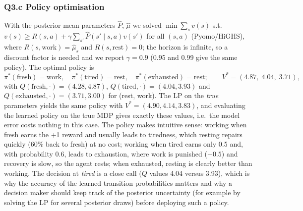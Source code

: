 \documentclass[10pt,a4paper]{article}
\begin{document}
\subsubsection{Q3.c Policy optimisation} With the posterior-mean parameters $\hat P$, $\hat\mu$ we solved $\min\sum_s v(s)$ s.t.\ $v(s)\ge R(s,a)+\gamma\sum_{s'}\hat P(s'\mid s,a)v(s')$ for all $(s,a)$ (Pyomo/HiGHS), where $R(s,\text{work})=\hat\mu_s$ and $R(s,\text{rest})=0$; the horizon is infinite, so a discount factor is needed and we report $\gamma=0.9$ (0.95 and 0.99 give the same policy). The optimal policy is
\begin{equation*}
\pi^\ast(\text{fresh})=\text{work},\quad \pi^\ast(\text{tired})=\text{rest},\quad \pi^\ast(\text{exhausted})=\text{rest};\qquad
V^\ast=(4.87,\;4.04,\;3.71),
\end{equation*}
with $Q(\text{fresh},\cdot)=(4.28,4.87)$, $Q(\text{tired},\cdot)=(4.04,3.93)$ and $Q(\text{exhausted},\cdot)=(3.71,3.00)$ for (rest, work). The LP on the \emph{true} parameters yields the same policy with $V^\ast=(4.90,4.14,3.83)$, and evaluating the learned policy on the true MDP gives exactly these values, i.e.\ the model error costs nothing in this case. The policy makes intuitive sense: working when fresh earns the +1 reward and usually leads to tiredness, which resting repairs quickly (60\% back to fresh) at no cost; working when tired earns only 0.5 and, with probability 0.6, leads to exhaustion, where work is punished ($-0.5$) and recovery is slow, so the agent rests; when exhausted, resting is clearly better than working. The decision at \emph{tired} is a close call ($Q$ values 4.04 versus 3.93), which is why the accuracy of the learned transition probabilities matters and why a decision maker should keep track of the posterior uncertainty (for example by solving the LP for several posterior draws) before deploying such a policy.
\end{document}
